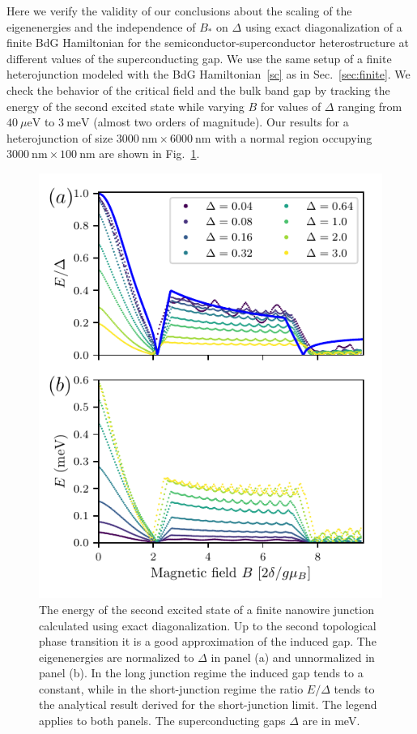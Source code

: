Here we verify the validity of our conclusions about the scaling of the eigenenergies and the independence of $B_*$ on $\Delta$ using exact diagonalization of a finite BdG Hamiltonian for the semiconductor-superconductor heterostructure at different values of the superconducting gap.
We use the same setup of a finite heterojunction modeled with the BdG Hamiltonian~\eqref{sc} as in Sec.~\ref{sec:finite}.
We check the behavior of the critical field and the bulk band gap by tracking the energy of the second excited state while varying $B$ for values of $\Delta$ ranging from $\SI{40}{\mu\eV}$ to $\SI{3}{\meV}$ (almost two orders of magnitude).
Our results for a heterojunction of size $\SI{3000}{\nm}\times\SI{6000}{\nm}$ with a normal region occupying $\SI{3000}{\nm}\times\SI{100}{\nm}$ are shown in Fig.~\ref{fig:scaling_delta}.

\begin{figure}
\begin{center}
\includegraphics[width=0.7\columnwidth]{chapter_shortjunction/figures/scaling_ref}
\caption{The energy of the second excited state of a finite nanowire junction calculated using exact diagonalization.
Up to the second topological phase transition it is a good approximation of the induced gap.
The eigenenergies are normalized to $\Delta$ in panel (a) and unnormalized in panel (b).
In the long junction regime the induced gap tends to a constant, while in the short-junction regime the ratio $E/\Delta$ tends to the analytical result derived for the short-junction limit.
The legend applies to both panels.
The superconducting gaps $\Delta$ are in meV.}
\label{fig:scaling_delta}
\end{center}
\end{figure}

